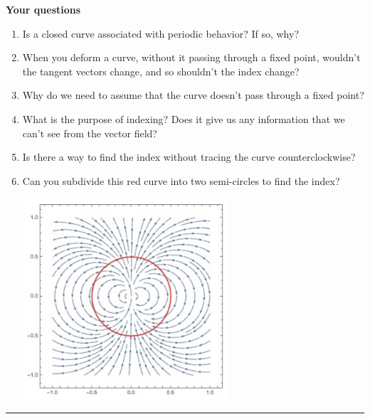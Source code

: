\documentclass[12pt,letterpaper,noanswers]{exam}
\begin{document}
\noindent\textbf{Your questions}
\begin{enumerate}
    \item Is a closed curve associated with periodic behavior?  If so, why?
    
    \item When you deform a curve, without it passing through a fixed point, wouldn't the tangent vectors change, and so shouldn't the index change?
    
    \item Why do we need to assume that the curve doesn't pass through a fixed point?
    
    \item What is the purpose of indexing?  Does it give us any information that we can't see from the vector field?
    
    \item Is there a way to find the index without tracing the curve counterclockwise?
    
    \item Can you subdivide this red curve into two semi-circles to find the index?
    
    \includegraphics[width=3in]{img/C13indexcheckyourself.png}
\end{enumerate}

\vspace{0.2cm}
\hrule
\vspace{0.2cm}
\end{document}
